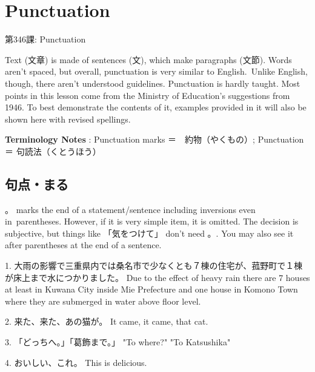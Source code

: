     
\chapter{Punctuation}

\begin{center}
\begin{Large}
第346課: Punctuation  
\end{Large}
\end{center}
 
\par{ Text (文章) is made of sentences (文), which make paragraphs (文節). Words aren't spaced, but overall, punctuation is very similar to English. Unlike English, though, there aren't understood guidelines. Punctuation is hardly taught. Most points in this lesson come from the Ministry of Education's suggestions from 1946. To best demonstrate the contents of it, examples provided in it will also be shown here with revised spellings. }

\par{\textbf{Terminology Notes }: Punctuation marks ＝　約物（やくもの）; Punctuation ＝ 句読法（くとうほう） }
      
\section{句点・まる}
 
\par{ 。 marks the end of a statement\slash sentence including inversions even in parentheses. However, if it is very simple item, it is omitted. The decision is subjective, but things like 「気をつけて」 don't need 。. You may also see it after parentheses at the end of a sentence. }
 
\par{1. 大雨の影響で三重県内では桑名市で少なくとも７棟の住宅が、菰野町で１棟が床上まで水につかりました。 \hfill\break
Due to the effect of heavy rain there are 7 houses at least in Kuwana City inside Mie Prefecture and one house in Komono Town where they are submerged in water above floor level. }
 
\par{2. 来た、来た、あの猫が。 \hfill\break
It came, it came, that cat. }
 
\par{3. 「どっちへ。」「葛飾まで。」 \hfill\break
"To where?" "To Katsushika" }
 
\par{4. おいしい、これ。 \hfill\break
This is delicious. }
 
